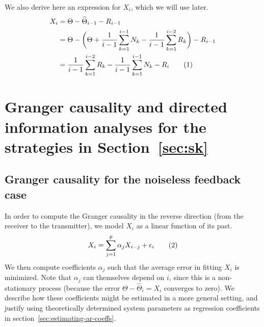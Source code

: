 \documentclass[letterpaper, 10pt, conference]{ieeeconf}
\newcommand\numberthis{\stepcounter{equation}\tag{\theequation}}
\begin{document}
We also derive here an expression for $X_i$, which we will use later.
\begin{align*}
	X_i &= \Theta - \widehat\Theta_{i-1} - R_{i-1} \\
	&= \Theta - \bigg( \Theta + \frac{1}{i-1} \sum_{k=1}^{i-1} N_k - \frac{1}{i-1} \sum_{k=1}^{i-2} R_k \bigg) - R_{i-1} \\
	&= \frac{1}{i-1} \sum_{k=1}^{i-2} R_k - \frac{1}{i-1} \sum_{k=1}^{i-1} N_k - R_{i} \numberthis \label{eq:x_i-noisy}
\end{align*}


\section{Granger causality and directed information analyses for the strategies in Section~\ref{sec:sk}}
\label{sec:analytical-results}


\subsection{Granger causality for the noiseless feedback case}
\label{sec:gc-noiseless}


In order to compute the Granger causality in the reverse direction (from the receiver to the transmitter), we model $X_i$ as a linear function of its past.
\begin{equation*}
	X_i = \sum_{j=1}^{p}{\alpha_j X_{i-j}} + \epsilon_i \numberthis \label{eq:ar-model-x-x}
\end{equation*}
We then compute coefficients $\alpha_j$ such that the average error in fitting $X_i$ is minimized. Note that $\alpha_j$ can themselves depend on $i$, since this is a non-stationary process (because the error $\Theta-\widehat{\Theta}_i = X_i$ converges to zero). We describe how these coefficients might be estimated in a more general setting, and justify using theoretically determined system parameters as regression coefficients in section~\ref{sec:estimating-ar-coeffs}.
\end{document}
